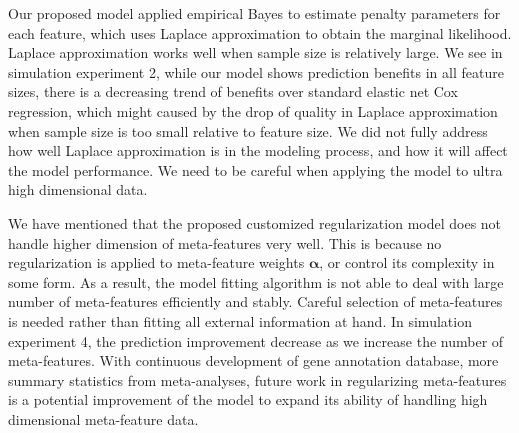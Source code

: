 Our proposed model applied empirical Bayes to estimate penalty parameters for each feature, which uses Laplace approximation to obtain the marginal likelihood. Laplace approximation works well when sample size is relatively large. We see in simulation experiment 2, while our model shows prediction benefits in all feature sizes, there is a decreasing trend of benefits over standard elastic net Cox regression, which might caused by the drop of quality in Laplace approximation when sample size is too small relative to feature size. We did not fully address how well Laplace approximation is in the modeling process, and how it will affect the model performance. We need to be careful when applying the model to ultra high dimensional data. 

We have mentioned that the proposed customized regularization model does not handle higher dimension of meta-features very well. This is because no regularization is applied to meta-feature weights $\bm{\alpha}$, or control its complexity in some form. As a result, the model fitting algorithm is not able to deal with large number of meta-features efficiently and stably. Careful selection of meta-features is needed rather than fitting all external information at hand. In simulation experiment 4, the prediction improvement decrease as we increase the number of meta-features. With continuous development of gene annotation database, more summary statistics from meta-analyses, future work in regularizing meta-features is a potential improvement of the model to expand its ability of handling high dimensional meta-feature data.
